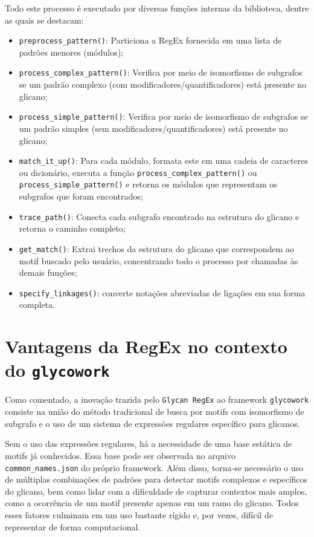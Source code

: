 Todo este processo é executado por diversas funções internas da biblioteca,
dentre as quais se destacam:
\begin{itemize}
	\item \texttt{preprocess\_pattern()}: Particiona a RegEx fornecida em uma lista de padrões menores (módulos);
	\item \texttt{process\_complex\_pattern()}: Verifica por meio de isomorfismo de subgrafos se um padrão complexo (com modificadores/quantificadores) está presente no glicano;
	\item \texttt{process\_simple\_pattern()}: Verifica por meio de isomorfismo de subgrafos se um padrão simples (sem modificadores/quantificadores) está presente no glicano;
	\item \texttt{match\_it\_up()}: Para cada módulo, formata este em uma cadeia de caracteres ou dicionário, executa a função \texttt{process\_complex\_pattern()} ou \texttt{process\_simple\_pattern()} e retorna os módulos que representam os subgrafos que foram encontrados;
	\item \texttt{trace\_path()}: Conecta cada subgrafo encontrado na estrutura do glicano e retorna o caminho completo;
	\item \texttt{get\_match()}: Extrai trechos da estrutura do glicano que correspondem ao motif buscado pelo usuário, concentrando todo o processo por chamadas às demais funções;
	\item \texttt{specify\_linkages()}: converte notações abreviadas de ligações em sua forma completa.
\end{itemize}

\section{Vantagens da RegEx no contexto do \texttt{glycowork}}

Como comentado, a inovação trazida pelo \texttt{Glycan RegEx} ao framework
\texttt{glycowork} consiste na união do método tradicional de busca por motifs
com isomorfismo de subgrafo e o uso de um sistema de expressões regulares
específico para glicanos.

Sem o uso das expressões regulares, há a necessidade de uma base estática de
motifs já conhecidos. Essa base pode ser observada no arquivo
\texttt{common\_names.json} do próprio framework. Além disso, torna-se
necessário o uso de múltiplas combinações de padrões para detectar motifs
complexos e específicos do glicano, bem como lidar com a dificuldade de
capturar contextos mais amplos, como a ocorrência de um motif presente apenas
em um ramo do glicano. Todos esses fatores culminam em um uso bastante rígido
e, por vezes, difícil de representar de forma computacional.

